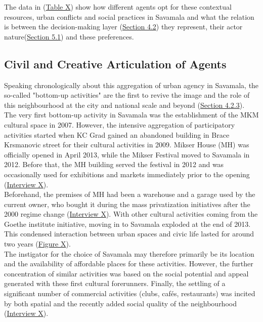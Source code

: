 \documentclass[11pt]{report}
\begin{document}
{{{{The data in (\href{Table 1}{Table X}) show how different agents opt for these contextual resources, urban conflicts and social practices in Savamala and what the relation is between the decision-making layer (\href{Section 4.2}{Section 4.2}) they represent, their actor nature(\href{Section 5.1}{Section 5.1}) and these preferences. 

\subsection{Civil and Creative Articulation of Agents}

Speaking chronologically about this aggregation of urban agency in Savamala, the so-called "bottom-up activities" are the first to revive the image and the role of this neighbourhood at the city and national scale and beyond (\href{Section 4.2.3}{Section 4.2.3}).
\\

The very first bottom-up activity in Savamala was the establishment of the MKM cultural space in 2007. However, the intensive aggregation of participatory activities started when KC Grad gained an abandoned building in Brace Krsmanovic street for their cultural activities in 2009. Mikser House (MH) was officially opened in April 2013, while the Mikser Festival moved to Savamala in 2012. Before that, the MH building served the festival in 2012 and was occasionally used for exhibitions and markets immediately prior to the opening 
(\href{InterviewX}{Interview X}).
\\

Beforehand, the premises of MH had been a warehouse and a garage used by the current owner, who bought it during the mass privatization initiatives after the 2000 regime change (\href{InterviewX}{Interview X}).
With other cultural activities coming from the Goethe institute initiative, moving in to Savamala exploded at the end of 2013. This condensed interaction between urban spaces and civic life lasted for around two years (\href{Figure 2}{Figure X}).
\\

The instigator for the choice of Savamala may therefore primarily be its location and the availability of affordable places for these activities. However, the further concentration of similar activities was based on the social potential and appeal generated with these first cultural forerunners. Finally, the settling of a significant number of commercial activities (clubs, cafés, restaurants) was incited by both spatial and the recently added social quality of the neighbourhood 
(\href{InterviewX}{Interview X}).
\\

}}}}
\end{document}
